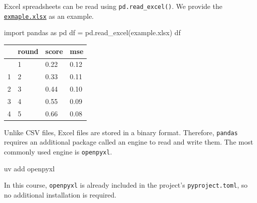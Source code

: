 \documentclass[
  letterpaper,
  DIV=11,
  numbers=noendperiod]{scrreprt}
\newenvironment{Shaded}{\begin{snugshade}}{\end{snugshade}}
\newcommand{\ExtensionTok}[1]{\textcolor[rgb]{0.00,0.23,0.31}{#1}}
\newcommand{\ImportTok}[1]{\textcolor[rgb]{0.00,0.46,0.62}{#1}}
\newcommand{\NormalTok}[1]{\textcolor[rgb]{0.00,0.23,0.31}{#1}}
\newcommand{\OperatorTok}[1]{\textcolor[rgb]{0.37,0.37,0.37}{#1}}
\newcommand{\StringTok}[1]{\textcolor[rgb]{0.13,0.47,0.30}{#1}}
\newcounter{none} %
\theoremstyle{definition}
\theoremstyle{definition}
\theoremstyle{plain}
\theoremstyle{plain}
\theoremstyle{remark}
\begin{document}
\begin{tcolorbox}[enhanced jigsaw, arc=.35mm, bottomrule=.15mm, bottomtitle=1mm, breakable, colback=white, colbacktitle=quarto-callout-note-color!10!white, colframe=quarto-callout-note-color-frame, coltitle=black, left=2mm, leftrule=.75mm, opacityback=0, opacitybacktitle=0.6, rightrule=.15mm, title=\textcolor{quarto-callout-note-color}{\faInfo}\hspace{0.5em}{Excel}, titlerule=0mm, toprule=.15mm, toptitle=1mm]

Excel spreadsheets can be read using \texttt{pd.read\_excel()}. We
provide the \href{example.xlsx}{\texttt{exmaple.xlsx}} as an example.

\begin{Shaded}
\begin{Highlighting}[]
\ImportTok{import}\NormalTok{ pandas }\ImportTok{as}\NormalTok{ pd}
\NormalTok{df }\OperatorTok{=}\NormalTok{ pd.read\_excel(}\StringTok{\textquotesingle{}example.xlsx\textquotesingle{}}\NormalTok{)}
\NormalTok{df}
\end{Highlighting}
\end{Shaded}

{\def\LTcaptype{none} %
\begin{longtable}[]{@{}llll@{}}
\toprule\noalign{}
& round & score & mse \\
\midrule\noalign{}
\endhead
\bottomrule\noalign{}
\endlastfoot
0 & 1 & 0.22 & 0.12 \\
1 & 2 & 0.33 & 0.11 \\
2 & 3 & 0.44 & 0.10 \\
3 & 4 & 0.55 & 0.09 \\
4 & 5 & 0.66 & 0.08 \\
\end{longtable}
}

Unlike CSV files, Excel files are stored in a binary format. Therefore,
\texttt{pandas} requires an additional package called an engine to read
and write them. The most commonly used engine is \texttt{openpyxl}.

\begin{Shaded}
\begin{Highlighting}[]
\ExtensionTok{uv}\NormalTok{ add openpyxl}
\end{Highlighting}
\end{Shaded}

In this course, \texttt{openpyxl} is already included in the project's
\texttt{pyproject.toml}, so no additional installation is required.

\end{tcolorbox}
\end{document}
